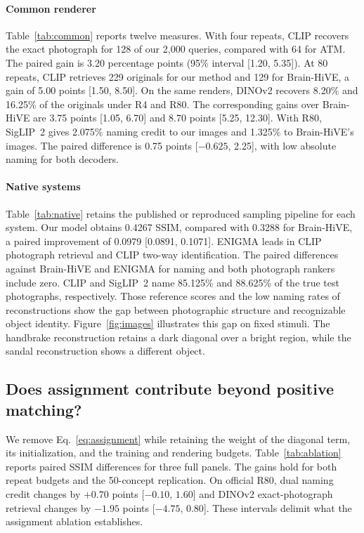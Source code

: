 \documentclass[letterpaper,10pt,conference]{IEEEtran}
\begin{document}
\paragraph{Common renderer}
Table~\ref{tab:common} reports twelve measures. With four repeats, CLIP recovers the exact photograph for 128 of our 2,000 queries, compared with 64 for ATM. The paired gain is 3.20 percentage points (95\% interval [1.20, 5.35]). At 80 repeats, CLIP retrieves 229 originals for our method and 129 for Brain-HiVE, a gain of 5.00 points [1.50, 8.50]. On the same renders, DINOv2 recovers 8.20\% and 16.25\% of the originals under R4 and R80. The corresponding gains over Brain-HiVE are 3.75 points [1.05, 6.70] and 8.70 points [5.25, 12.30]. With R80, SigLIP~2 gives 2.075\% naming credit to our images and 1.325\% to Brain-HiVE's images. The paired difference is 0.75 points [$-0.625$, 2.25], with low absolute naming for both decoders.

\paragraph{Native systems}
Table~\ref{tab:native} retains the published or reproduced sampling pipeline for each system. Our model obtains 0.4267 SSIM, compared with 0.3288 for Brain-HiVE, a paired improvement of 0.0979 [0.0891, 0.1071]. ENIGMA leads in CLIP photograph retrieval and CLIP two-way identification. The paired differences against Brain-HiVE and ENIGMA for naming and both photograph rankers include zero. CLIP and SigLIP~2 name 85.125\% and 88.625\% of the true test photographs, respectively. Those reference scores and the low naming rates of reconstructions show the gap between photographic structure and recognizable object identity. Figure~\ref{fig:images} illustrates this gap on fixed stimuli. The handbrake reconstruction retains a dark diagonal over a bright region, while the sandal reconstruction shows a different object.

\subsection{Does assignment contribute beyond positive matching?}

We remove Eq.~\eqref{eq:assignment} while retaining the weight of the diagonal term, its initialization, and the training and rendering budgets. Table~\ref{tab:ablation} reports paired SSIM differences for three full panels. The gains hold for both repeat budgets and the 50-concept replication. On official R80, dual naming credit changes by \(+0.70\) points [\(-0.10\), \(1.60\)] and DINOv2 exact-photograph retrieval changes by \(-1.95\) points [\(-4.75\), \(0.80\)]. These intervals delimit what the assignment ablation establishes.
\end{document}
